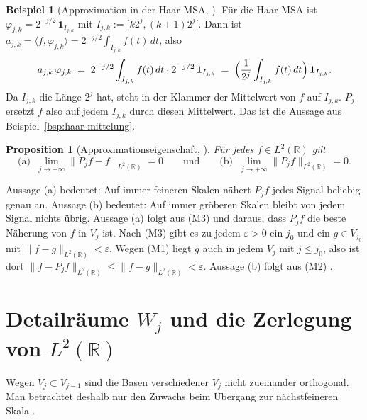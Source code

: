 \documentclass[a4paper,11pt,bibliography=totoc,listof=totoc,headinclude=true,cleardoublepage=empty,oneside]{scrbook}
\theoremstyle{plain}
\newtheorem{Proposition}[Satz]{Proposition}
\theoremstyle{definition}
\newtheorem{Beispiel}[Satz]{Beispiel}
\newcommand{\R}{\mathbb{R}}
\newcommand{\LZwei}{L^2(\R)}
\newcommand{\scal}[2]{\langle #1, #2 \rangle}
\newcommand{\norm}[1]{\lVert #1 \rVert}
\begin{document}
\begin{Beispiel}[Approximation in der Haar-MSA, {\cite[Kap.~2.2]{lmr}}] %
\label{bsp:haar-pj}
Für die Haar-MSA ist $\varphi_{j,k} = 2^{-j/2}\,\mathbf 1_{I_{j,k}}$ mit
$I_{j,k} := [k2^{j},(k+1)2^{j}[$. Dann ist
$a_{j,k} = \scal{f}{\varphi_{j,k}} = 2^{-j/2}\int_{I_{j,k}} f(t)\,dt$, also
\[
  a_{j,k}\,\varphi_{j,k}
  \;=\; 2^{-j/2}\int_{I_{j,k}} f(t)\,dt \cdot 2^{-j/2}\,\mathbf 1_{I_{j,k}}
  \;=\; \Bigl(\frac{1}{2^{j}}\int_{I_{j,k}} f(t)\,dt\Bigr)\,\mathbf 1_{I_{j,k}} .
\]
Da $I_{j,k}$ die Länge $2^j$ hat, steht in der Klammer der Mittelwert von $f$
auf $I_{j,k}$. $P_j$ ersetzt $f$ also auf jedem $I_{j,k}$ durch diesen
Mittelwert. Das ist die Aussage aus Beispiel~\ref{bsp:haar-mittelung}.
\end{Beispiel}

\begin{Proposition}[Approximationseigenschaft, {\cite[Bem.~2.2.2\,(a)]{lmr}}] %
\label{prop:approximation}
Für jedes $f \in \LZwei$ gilt
\[
  \text{(a)}\;\; \lim_{j\to-\infty} \norm{P_j f - f}_{\LZwei} = 0
  \qquad\text{und}\qquad
  \text{(b)}\;\; \lim_{j\to+\infty} \norm{P_j f}_{\LZwei} = 0 .
\]
\end{Proposition}

Aussage (a) bedeutet: Auf immer feineren Skalen nähert $P_j f$ jedes Signal
beliebig genau an. Aussage (b) bedeutet: Auf immer gröberen Skalen bleibt von
jedem Signal nichts übrig. Aussage (a) folgt aus (M3) und daraus, dass $P_j f$
die beste Näherung von $f$ in $V_j$ ist. Nach (M3) gibt es zu jedem
$\varepsilon > 0$ ein $j_0$ und ein $g \in V_{j_0}$ mit
$\norm{f - g}_{\LZwei} < \varepsilon$. Wegen (M1) liegt $g$ auch in jedem
$V_j$ mit $j \le j_0$, also ist dort
$\norm{f - P_j f}_{\LZwei} \le \norm{f - g}_{\LZwei} < \varepsilon$.
Aussage (b) folgt aus (M2) \cite[Prop.~(5.1)]{blatter}. %
 
\section{Detailräume \texorpdfstring{$W_j$}{Wj} und die Zerlegung von \texorpdfstring{$L^2(\R)$}{L2(R)}}
\label{sec:detailraeume}

Wegen $V_j \subset V_{j-1}$ sind die Basen verschiedener $V_j$ nicht
zueinander orthogonal. Man betrachtet deshalb nur den Zuwachs beim Übergang
zur nächstfeineren Skala \cite[Kap.~5.1]{blatter}. %
\end{document}
